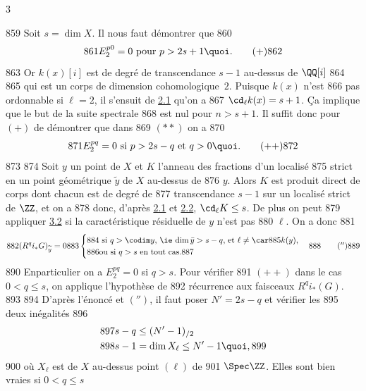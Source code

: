 3	\documentclass[10pt]{../fichiers-configuration-latex/smfart}
\begin{document}
   859	Soit $s=\dim X$. Il nous faut démontrer que
   860	\begin{equation*}
   861	E^{p0}_2=0\mbox{ pour } p> 2s+1{\quoi}.\tag{$+$}
   862	\end{equation*}
   863	Or $k(x)[i]$ est de degré de transcendance $s-1$ au-dessus de $\QQ[i]$
   864	%
   865	qui est un corps de dimension cohomologique $2$. Puisque $k(x)$ n'est
   866	pas ordonnable si $\ell=2$, il s'ensuit de \hyperref[X.thm2.1]{2.1} qu'on a
   867	$\cd_{\ell}k(x)=s+1$. Ça implique que le but de la suite spectrale
   868	est nul pour $n>s+1$. Il suffit donc pour $(+)$ de démontrer que dans
   869	$({\ast}{\ast})$ on a
   870	\begin{equation*}
   871	E^{pq}_2=0\mbox{ si } p>2s-q\mbox{ et } q>0{\quoi}.\tag{${+}{+}$}
   872	\end{equation*}
   873	
   874	Soit $y$ un point de $X$ et $K$ l'anneau des fractions d'un localisé
   875	strict en un point géométrique $\widetilde{y}$ de $X$ au-dessus de
   876	$y$. Alors $K$ est produit direct de corps dont chacun est de degré de
   877	transcendance $s-1$ sur un localisé strict de $\ZZ$, et on a
   878	donc, d'après \hyperref[X.thm2.1]{2.1} et \hyperref[X.thm2.2]{2.2}, $\cd_{\ell}K\leq s$. De plus on peut
   879	appliquer \hyperref[X.prop3.2]{3.2} si la caractéristique résiduelle de $y$ n'est pas
   880	$\ell$. On a donc
   881	\begin{equation*}
   882	(R^qi_{\ast}G)_{\widetilde{y}}=0
   883	\begin{cases}
   884	\mbox{ si $q>\codim y$, \ie $\dim \bar{y}>s-q$, et $\ell\neq \car
   885	k(y)$,}\\
   886	\mbox{ou si $q>s$ en tout cas.}
   887	\end{cases}
   888	\tag{$''$}
   889	\end{equation*}
   890	En\pageoriginale particulier on a $E^{pq}_2=0$ si $q>s$. Pour vérifier
   891	$({+}{+})$ dans le cas $0<q\leq s$, on applique l'hypothèse de
   892	récurrence aux faisceaux $R^qi_{\ast}(G)$.
   893	
   894	D'après l'énoncé et $('')$, il faut poser $N'=2s-q$ et vérifier les
   895	deux inégalités
   896	\begin{align*}
   897	& s-q\leq (N'-1)_{/2}\\
   898	& s-1=\dim X_{\ell}\leq N'-1{\quoi},
   899	\end{align*}
   900	où $X_{\ell}$ est  de $X$ au-dessus  point $(\ell)$ de
   901	$\Spec \ZZ$. Elles sont bien vraies si $0<q\leq s$ \cqfd
\end{document}
